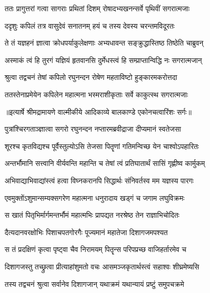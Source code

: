 \twolineshloka
{ततः प्रागुत्तरां गत्वा सागराः प्रथितां दिशम्}
{रोषादभ्यखनन्सर्वे पृथिवीं सगरात्मजाः} %

\twolineshloka
{ददृशुः कपिलं तत्र वासुदेवं सनातनम्}
{हयं च तस्य देवस्य चरन्तमविदूरतः} %

\twolineshloka
{ते तं यज्ञहनं ज्ञात्वा क्रोधपर्याकुलेक्षणाः}
{अभ्यधावन्त सङ्क्रुद्धास्तिष्ठ तिष्ठेति चाब्रुवन्} %

\twolineshloka
{अस्माकं त्वं हि तुरगं यज्ञियं हृतवानसि}
{दुर्मेधस्त्वं हि सम्प्राप्तान्विद्धि नः सगरात्मजान्} %

\twolineshloka
{श्रुत्वा तद्वचनं तेषां कपिलो रघुनन्दन}
{रोषेण महताविष्टो हुङ्कारमकरोत्तदा} %

\twolineshloka
{ततस्तेनाप्रमेयेन कपिलेन महात्मना}
{भस्मराशीकृताः सर्वे काकुत्स्थ सगरात्मजाः} %


{॥इत्यार्षे श्रीमद्रामायणे वाल्मीकीये आदिकाव्ये बालकाण्डे एकोनचत्वारिंशः सर्गः॥}


\twolineshloka
{पुत्रांश्चिरगताञ्ज्ञात्वा सगरो रघुनन्दन}
{नप्तारमब्रवीद्राजा दीप्यमानं स्वतेजसा} %

\twolineshloka
{शूरश्च कृतविद्यश्च पूर्वैस्तुल्योऽसि तेजसा}
{पितॄणां गतिमन्विच्छ येन चाश्वोऽपहारितः} %

\twolineshloka
{अन्तर्भौमानि सत्त्वानि वीर्यवन्ति महान्ति च}
{तेषां त्वं प्रतिघातार्थं सासिं गृह्णीष्व कार्मुकम्} %

\twolineshloka
{अभिवाद्याभिवाद्यांस्त्वं हत्वा विघ्नकरानपि}
{सिद्धार्थः संनिवर्तस्व मम यज्ञस्य पारगः} %

\twolineshloka
{एवमुक्तोंऽशुमान्सम्यक्सगरेण महात्मना}
{धनुरादाय खड्गं च जगाम लघुविक्रमः} %

\twolineshloka
{स खातं पितृभिर्मार्गमन्तर्भौमं महात्मभिः}
{प्रापद्यत नरश्रेष्ठ तेन राज्ञाभिचोदितः} %

\twolineshloka
{दैत्यदानवरक्षोभिः पिशाचपतगोरगैः}
{पूज्यमानं महातेजा दिशागजमपश्यत} %

\twolineshloka
{स तं प्रदक्षिणं कृत्वा पृष्ट्वा चैव निरामयम्}
{पितॄन्स परिपप्रच्छ वाजिहर्तारमेव च} %

\twolineshloka
{दिशागजस्तु तच्छ्रुत्वा प्रीत्याहांशुमतो वचः}
{आसमञ्जकृतार्थस्त्वं सहाश्वः शीघ्रमेष्यसि} %

\twolineshloka
{तस्य तद्वचनं श्रुत्वा सर्वानेव दिशागजान्}
{यथाक्रमं यथान्यायं प्रष्टुं समुपचक्रमे} %

